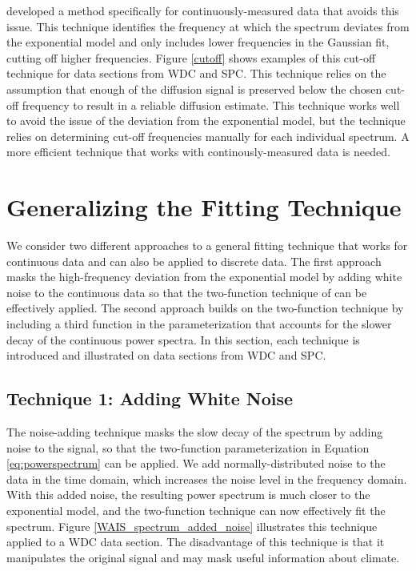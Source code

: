 \documentclass[draft, jgrga]{AGUTeX}
\begin{document}
\begin{article}
\citet{Jones2017a} developed a method specifically for continuously-measured data that avoids this issue. This technique identifies the frequency at which the spectrum deviates from the exponential model and only includes lower frequencies in the Gaussian fit, cutting off higher frequencies. Figure \ref{cutoff} shows examples of this cut-off technique for data sections from WDC and SPC. This technique relies on the assumption that enough of the diffusion signal is preserved below the chosen cut-off frequency to result in a reliable diffusion estimate. This technique works well to avoid the issue of the deviation from the exponential model, but the technique relies on determining cut-off frequencies manually for each individual spectrum. A more efficient technique that works with continously-measured data is needed.

\section{Generalizing the Fitting Technique}
We consider two different approaches to a general fitting technique that works for continuous data and can also be applied to discrete data. The first approach masks the high-frequency deviation from the exponential model by adding white noise to the continuous data so that the two-function technique of \citet{Gkinis2014} can be effectively applied. The second approach builds on the two-function technique by including a third function in the parameterization that accounts for the slower decay of the continuous power spectra. In this section, each technique is introduced and illustrated on data sections from WDC and SPC.

\subsection{Technique 1: Adding White Noise}
The noise-adding technique masks the slow decay of the spectrum by adding noise to the signal, so that the two-function parameterization in Equation \ref{eq:powerspectrum} can be applied. We add normally-distributed noise to the data in the time domain, which increases the noise level in the frequency domain. With this added noise, the resulting power spectrum is much closer to the exponential model, and the two-function technique can now effectively fit the spectrum. Figure \ref{WAIS_spectrum_added_noise} illustrates this technique applied to a WDC data section. The disadvantage of this technique is that it manipulates the original signal and may mask useful information about climate.


\end{article}
\end{document}
